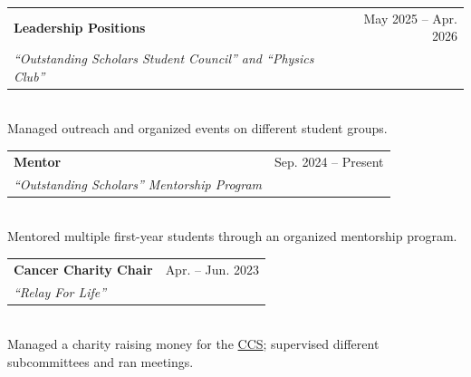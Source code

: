\documentclass[11pt]{article}
\makeatletter
\newcommand{\activity}[3]{
	\begin{tabular*}{\textwidth}{l@{\extracolsep{\fill}}r}
		\textbf{#1} & #3 \\
		\textit{#2} & \\
\end{tabular*} \\}
\makeatother
\begin{document}


\activity{Leadership Positions}{``Outstanding Scholars Student Council'' and ``Physics Club''}{May 2025 -- Apr. 2026}
Managed outreach and organized events on different student groups.

\activity{Mentor}{``Outstanding Scholars'' Mentorship Program}{Sep. 2024 -- Present}
Mentored multiple first-year students through an organized mentorship program.


\activity{Cancer Charity Chair}{``Relay For Life''}{Apr. -- Jun. 2023}
Managed a charity raising money for the \href{https://cancer.ca/en/}{CCS}; supervised different subcommittees and ran meetings.





\end{document}
